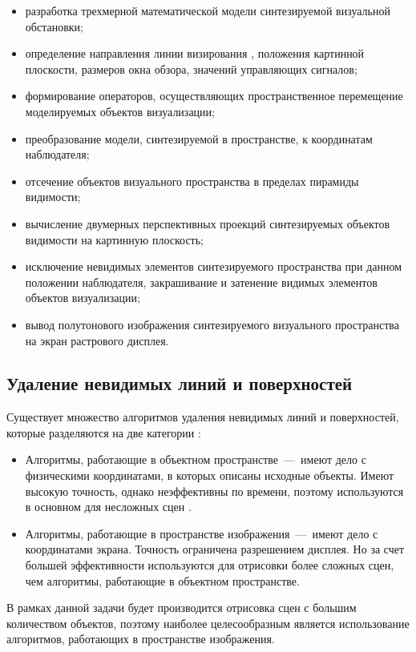 \begin{itemize}
	\item разработка трехмерной математической модели синтезируемой визуальной обстановки;
	\item определение направления линии визирования , положения картинной плоскости, размеров окна обзора, значений управляющих сигналов;
	\item формирование операторов, осуществляющих пространственное перемещение моделируемых объектов визуализации;
	\item преобразование модели, синтезируемой в пространстве, к координатам наблюдателя;
	\item отсечение объектов визуального пространства в пределах пирамиды видимости;
	\item вычисление двумерных перспективных проекций синтезируемых объектов видимости на картинную плоскость;
	\item исключение невидимых элементов синтезируемого пространства при данном положении наблюдателя, закрашивание и затенение видимых элементов объектов визуализации;
	\item вывод полутонового изображения синтезируемого визуального пространства на экран растрового дисплея.
\end{itemize}

\subsection{Удаление невидимых линий и поверхностей}
Существует множество алгоритмов удаления невидимых линий и поверхностей, которые разделяются на две категории \cite{bib:7}:

\begin{itemize}
	\item Алгоритмы, работающие в объектном пространстве~---~имеют дело с физическими координатами, в которых описаны исходные объекты. Имеют высокую точность, однако неэффективны по времени, поэтому используются в основном для несложных сцен \cite{bib:7}.
	\item Алгоритмы, работающие в пространстве изображения~---~имеют дело с координатами экрана. Точность ограничена разрешением дисплея. Но за счет большей эффективности используются для отрисовки более сложных сцен, чем алгоритмы, работающие в объектном пространстве.
\end{itemize}

В рамках данной задачи будет производится отрисовка сцен с большим количеством объектов, поэтому наиболее целесообразным является использование алгоритмов, работающих в пространстве изображения.

